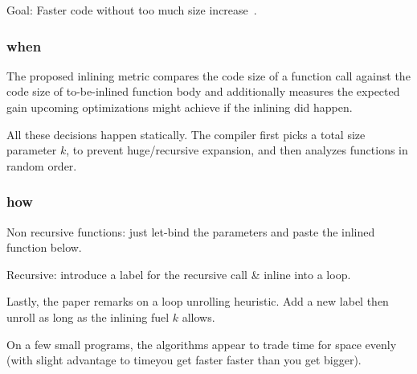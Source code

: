 \documentclass{article}
\begin{document}

Goal: Faster code without too much size increase~\cite{s-inline}.

\subsubsection*{when}
The proposed inlining metric compares the code size of a function call
 against the code size of to-be-inlined function body and additionally
 measures the expected gain upcoming optimizations might achieve if the
 inlining did happen.

All these decisions happen statically.
The compiler first picks a total size parameter $k$, to prevent huge/recursive
 expansion, and then analyzes functions in random order.


\subsubsection*{how}
Non recursive functions: just let-bind the parameters and paste the inlined function below.

Recursive: introduce a label for the recursive call \& inline into a loop.

Lastly, the paper remarks on a loop unrolling heuristic.
Add a new label then unroll as long as the inlining fuel $k$ allows.


On a few small programs, the algorithms appear to trade time for space evenly
 (with slight advantage to time\textemdash you get faster faster than you get bigger).



\footnotesize


\end{document}
